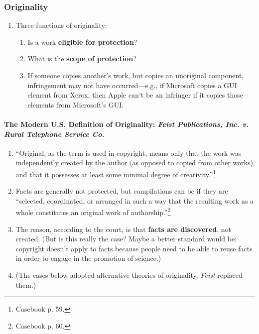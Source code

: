 \subsubsection{Originality}

\begin{enumerate}
    \item Three functions of originality:
    \begin{enumerate}
        \item Is a work \textbf{eligible for protection}?
        \item What is the \textbf{scope of protection}?
        \item If someone copies another's work, but copies an unoriginal 
        component, infringement may not have occurred---e.g., if Microsoft 
        copies a GUI element from Xerox, then Apple can't be an infringer if 
        it copies those elements from Microsoft's GUI.
    \end{enumerate}
\end{enumerate}

\paragraph{The Modern U.S. Definition of Originality: \emph{Feist 
Publications, Inc. v. Rural Telephone Service Co.}}

\begin{enumerate}
    \item ``Original, as the term is used in copyright, means only that the 
    work was independently created by the author (as opposed to copied from 
    other works), and that it possesses at least some minimal degree of 
    creativity.''\footnote{Casebook p. 59.}
    \item Facts are generally not protected, but compilations can be if they 
    are ``selected, coordinated, or arranged in such a way that the resulting 
    work as a whole constitutes an original work of 
    authorship.''\footnote{Casebook p. 60.}
    \item The reason, according to the court, is that \textbf{facts are 
    discovered}, not created. (But is this really the case? Maybe a better 
    standard would be: copyright doesn't apply to facts because people need to 
    be able to reuse facts in order to engage in the promotion of science.)
    \item (The cases below adopted alternative theories of originality. 
    \emph{Feist} replaced them.)
\end{enumerate}

